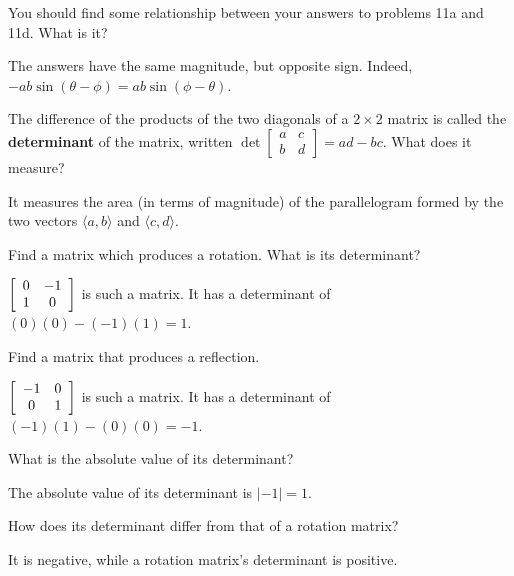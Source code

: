 \documentclass[../key.tex]{subfiles}
\begin{document}
\begin{inner_problem}
\item You should find some relationship between your answers to problems 11a and 11d. What is it?
\end{inner_problem}

The answers have the same magnitude, but opposite sign. Indeed, $-ab\sin(\theta-\phi) = ab\sin(\phi-\theta)$.

\begin{inner_problem}
\item The difference of the products of the two diagonals of a $2\times 2$ matrix is called the \textbf{determinant} of the matrix, written $\det \left[\begin{smallmatrix}a & c \\ b & d \end{smallmatrix}\right]=ad-bc$. What does it measure?
\end{inner_problem}

It measures the area (in terms of magnitude) of the parallelogram formed by the two vectors $\langle a,b\rangle$ and $\langle c,d\rangle$.

\begin{inner_problem}
\item Find a matrix which produces a rotation. What is its determinant?
\end{inner_problem}

$\left[\begin{array}{cc} 0 & -1 \\ 1 & 0 \end{array}\right]$ is such a matrix. It has a determinant of $(0)(0)-(-1)(1)=1$.

\begin{inner_problem}
\item Find a matrix that produces a reflection.
\end{inner_problem}

$\left[\begin{array}{cc} -1 & 0 \\ 0 & 1 \end{array}\right]$ is such a matrix. It has a determinant of $(-1)(1)-(0)(0)=-1$.

\begin{inner_problem}
\item What is the absolute value of its determinant?
\end{inner_problem}

The absolute value of its determinant is $|-1|=1$.

\begin{inner_problem}
\item How does its determinant differ from that of a rotation matrix?
\end{inner_problem}

It is negative, while a rotation matrix's determinant is positive.
\end{document}
